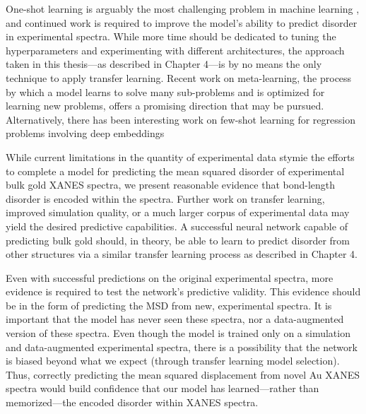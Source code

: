 One-shot learning is arguably the most challenging problem in machine learning \cite{transferlearning3}, and continued work is required to improve the model's ability to predict disorder in experimental spectra. While more time should be dedicated to tuning the hyperparameters and experimenting with different architectures, the approach taken in this thesis---as described in Chapter 4---is by no means the only technique to apply transfer learning. Recent work \cite{meta-learning-orig} \cite{huawei-meta-sgd} \cite{meta-learning2018} on meta-learning, the process by which a model learns to solve many sub-problems and is optimized for learning new problems, offers a promising direction that may be pursued. Alternatively, there has been interesting work on few-shot learning for regression problems involving deep embeddings \cite{deepembeddings-few-shot} 

While current limitations in the quantity of experimental data stymie the efforts to complete a model for predicting the mean squared disorder of experimental bulk gold XANES spectra, we present reasonable evidence that bond-length disorder is encoded within the spectra. Further work on transfer learning, improved simulation quality, or a much larger corpus of experimental data may yield the desired predictive capabilities. A successful neural network capable of predicting bulk gold should, in theory, be able to learn to predict disorder from other structures via a similar transfer learning process as described in Chapter 4.

Even with successful predictions on the original experimental spectra, more evidence is required to test the network's predictive validity. This evidence should be in the form of predicting the MSD from new, experimental spectra. It is important that the model has never seen these spectra, nor a data-augmented version of these spectra. Even though the model is trained only on a simulation and data-augmented experimental spectra, there is a possibility that the network is biased beyond what we expect (through transfer learning model selection). Thus, correctly predicting the mean squared displacement from novel Au XANES spectra would build confidence that our model has learned---rather than memorized---the encoded disorder within XANES spectra.
